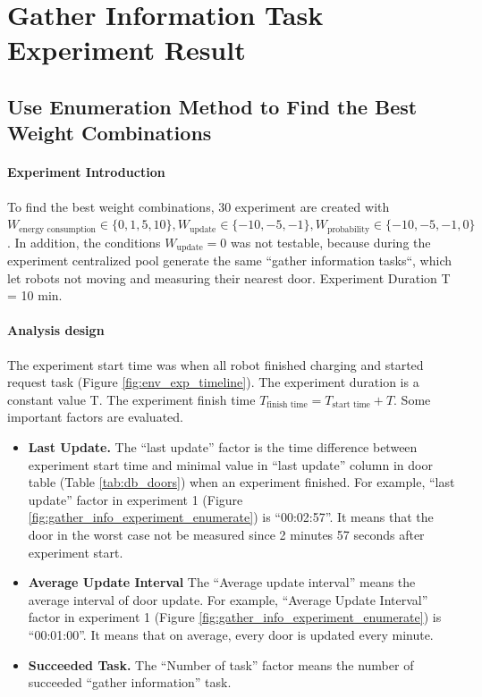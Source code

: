 \section{Gather Information Task Experiment Result}
\label{sec:gather_info_task_experiments}

\subsection{Use Enumeration Method to Find the Best Weight Combinations}
\label{sec:gather_info_experiment_enumerate}
\paragraph{Experiment Introduction} 
To find the best weight combinations, 30 experiment are created with $W_{\mbox{energy consumption}} \in \{ 0,1,5,10 \}, W_{\mbox{update}} \in \{-10,-5,-1\}, W_{\mbox{probability}} \in \{-10,-5,-1,0\}$. In addition, the conditions $W_{\mbox{update}}=0$ was not testable, because during the experiment centralized pool generate the same ``gather information tasks``, which let robots not moving and measuring their nearest door. Experiment Duration T = 10 min.


\paragraph{Analysis design} The experiment start time was when all robot finished charging and started request task (Figure \ref{fig:env_exp_timeline}). The experiment duration is a constant value T. The experiment finish time $T_{\mbox{finish time}} = T_{\mbox{start time}} + T $. Some important factors are evaluated. 

\begin{itemize}
 \item \textbf{Last Update.} The ``last update'' factor is the time difference between experiment start time and minimal value in ``last update'' column in door table (Table \ref{tab:db_doors}) when an experiment finished. For example, ``last update'' factor in experiment 1 (Figure \ref{fig:gather_info_experiment_enumerate}) is ``00:02:57''. It means that the door in the worst case not be measured since 2 minutes 57 seconds after experiment start.
 \item \textbf{Average Update Interval} The ``Average update interval'' means the average interval of door update. For example, ``Average Update Interval'' factor in experiment 1 (Figure \ref{fig:gather_info_experiment_enumerate}) is ``00:01:00''. It means that on average, every door is updated every minute.
 \item \textbf{Succeeded Task.} The ``Number of task'' factor means the number of succeeded ``gather information'' task.
\end{itemize}

